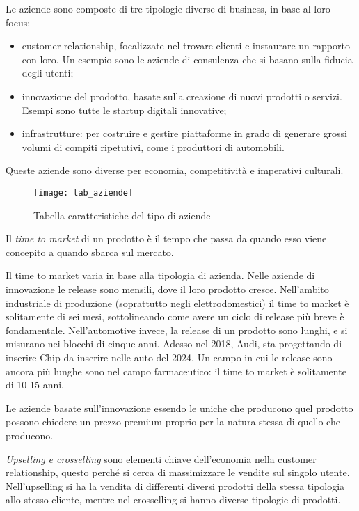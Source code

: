 Le aziende sono composte di tre tipologie diverse di business, in base al loro focus:
\begin{itemize}
\item customer relationship, focalizzate nel trovare clienti e instaurare un rapporto con loro. Un esempio sono le aziende di consulenza che si basano sulla fiducia degli utenti;
\item innovazione del prodotto, basate sulla creazione di nuovi prodotti o servizi. Esempi sono tutte le startup digitali innovative;
\item infrastrutture: per costruire e gestire piattaforme in grado di generare grossi volumi di compiti ripetutivi, come i produttori di automobili.
\end{itemize}
Queste aziende sono diverse per economia, competitività e imperativi culturali.

\begin{figure}[t]
 \centering
 \texttt{[image: tab\_aziende]}
 \caption{Tabella caratteristiche del tipo di aziende}
 \label{fig:bmi:tab_aziende}
\end{figure}

\begin{definition}
Il \textit{time to market} di un prodotto è il tempo che passa da quando esso
viene concepito a quando sbarca sul mercato.
\end{definition}

Il time to market varia in base alla tipologia di azienda. Nelle aziende di
innovazione le release sono mensili, dove il loro prodotto cresce. Nell'ambito
industriale di produzione (soprattutto negli elettrodomestici) il time to
market è solitamente di sei mesi, sottolineando come avere un ciclo di release
più breve è fondamentale. Nell'automotive invece, la release di un prodotto
sono lunghi, e si misurano nei blocchi di cinque anni. Adesso nel 2018, Audi,
sta progettando di inserire Chip da inserire nelle auto del 2024. Un campo in
cui le release sono ancora più lunghe sono nel campo farmaceutico: il time to
market è solitamente di 10-15 anni.

Le aziende basate sull'innovazione essendo le uniche che producono quel
prodotto possono chiedere un prezzo premium proprio per la natura stessa di
quello che producono.

\textit{Upselling e crosselling} sono elementi chiave dell'economia nella
customer relationship, questo perché si cerca di massimizzare le vendite sul
singolo utente. Nell'upselling si ha la vendita di differenti diversi prodotti
della stessa tipologia allo stesso cliente, mentre nel crosselling si hanno
diverse tipologie di prodotti.


